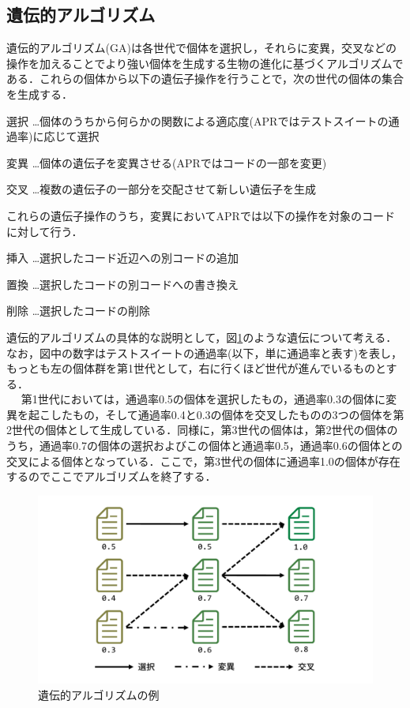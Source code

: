 \documentclass[uplatex,dvipdfmx,a4paper]{jsarticle}
\begin{document}
\subsection{遺伝的アルゴリズム}\label{sec:ga}
遺伝的アルゴリズム(GA)は各世代で個体を選択し，それらに変異，交叉などの操作を加えることでより強い個体を生成する生物の進化に基づくアルゴリズムである．これらの個体から以下の遺伝子操作を行うことで，次の世代の個体の集合を生成する．
\begin{description}
\item{選択} …個体のうちから何らかの関数による適応度(APRではテストスイートの通過率)に応じて選択
\item{変異} …個体の遺伝子を変異させる(APRではコードの一部を変更)
\item{交叉} …複数の遺伝子の一部分を交配させて新しい遺伝子を生成
\end{description}
これらの遺伝子操作のうち，変異においてAPRでは以下の操作を対象のコードに対して行う．\\
\begin{description}
\item{挿入} …選択したコード近辺への別コードの追加
\item{置換} …選択したコードの別コードへの書き換え
\item{削除} …選択したコードの削除
\end{description}
遺伝的アルゴリズムの具体的な説明として，図\ref{fig:ga}のような遺伝について考える．なお，図中の数字はテストスイートの通過率(以下，単に通過率と表す)を表し，もっとも左の個体群を第1世代として，右に行くほど世代が進んでいるものとする．\\　
第1世代においては，通過率0.5の個体を選択したもの，通過率0.3の個体に変異を起こしたもの，そして通過率0.4と0.3の個体を交叉したものの3つの個体を第2世代の個体として生成している．同様に，第3世代の個体は，第2世代の個体のうち，通過率0.7の個体の選択およびこの個体と通過率0.5，通過率0.6の個体との交叉による個体となっている．ここで，第3世代の個体に通過率1.0の個体が存在するのでここでアルゴリズムを終了する．
\begin{figure}[t]
  \centering
  \includegraphics[width=\linewidth]{fig/ga.pdf}
  \caption{遺伝的アルゴリズムの例}
  \label{fig:ga}
\end{figure}
\end{document}
